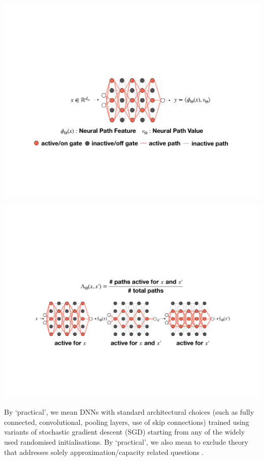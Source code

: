 \documentclass{article}
\begin{document}
\begin{center}
\includegraphics[scale=0.3]{figs/step1.pdf}
\end{center}


\begin{center}
\includegraphics[scale=0.3]{figs/step2.pdf}
\end{center}


{By `practical', we mean DNNs with standard architectural choices (such as fully connected, convolutional, pooling layers, use of skip connections) trained using variants of stochastic gradient descent (SGD) starting from any of the widely used randomised initialisations. By `practical', we also mean to exclude theory that addresses solely approximation/capacity related questions \cite{depth1,depth2}.
}
\end{document}
